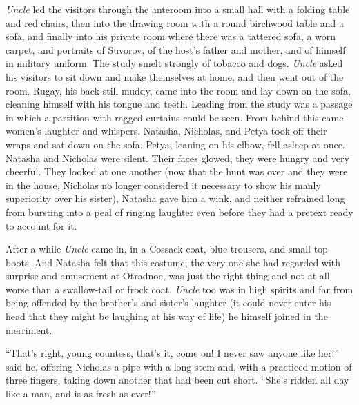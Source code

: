 \emph{Uncle} led the visitors through the anteroom into a small
hall with a folding table and red chairs, then into the drawing
room with a round birchwood table and a sofa, and finally into
his private room where there was a tattered sofa, a worn carpet,
and portraits of Suvorov, of the host's father and mother, and of
himself in military uniform. The study smelt strongly of tobacco
and dogs. \emph{Uncle} asked his visitors to sit down and make
themselves at home, and then went out of the room.  Rugay, his
back still muddy, came into the room and lay down on the sofa,
cleaning himself with his tongue and teeth. Leading from the
study was a passage in which a partition with ragged curtains
could be seen.  From behind this came women's laughter and
whispers. Natasha, Nicholas, and Petya took off their wraps and
sat down on the sofa. Petya, leaning on his elbow, fell asleep at
once. Natasha and Nicholas were silent.  Their faces glowed, they
were hungry and very cheerful. They looked at one another (now
that the hunt was over and they were in the house, Nicholas no
longer considered it necessary to show his manly superiority over
his sister), Natasha gave him a wink, and neither refrained long
from bursting into a peal of ringing laughter even before they
had a pretext ready to account for it.

After a while \emph{Uncle} came in, in a Cossack coat, blue
trousers, and small top boots. And Natasha felt that this
costume, the very one she had regarded with surprise and
amusement at Otradnoe, was just the right thing and not at all
worse than a swallow-tail or frock coat. \emph{Uncle} too was in
high spirits and far from being offended by the brother's and
sister's laughter (it could never enter his head that they might
be laughing at his way of life) he himself joined in the
merriment.

``That's right, young countess, that's it, come on! I never saw
anyone like her!'' said he, offering Nicholas a pipe with a long
stem and, with a practiced motion of three fingers, taking down
another that had been cut short. ``She's ridden all day like a
man, and is as fresh as ever!''

